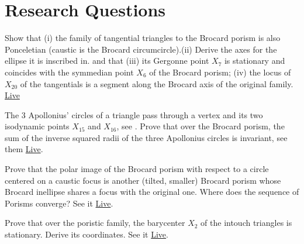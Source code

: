\section{Research Questions}

\begin{question}
Show that (i) the family of tangential triangles to the Brocard porism is also Ponceletian (caustic is the Brocard circumcircle).(ii) Derive the axes for the ellipse it is inscribed in.  and that (iii) its Gergonne point $X_7$ is stationary and coincides with the symmedian point $X_6$ of the Brocard porism; (iv) the locus of $X_{20}$ of the tangentials is a segment along the Brocard axis of the original family. \href{https://bit.ly/2RpNxdn}{Live} 
\end{question}

\begin{question}
The 3 Apollonius' circles of a triangle pass through a vertex and its two isodynamic points $X_{15}$ and $X_{16}$, see \cite[Isodynamic points]{mw}. Prove that over the Brocard porism, the sum of the inverse squared radii of the three Apollonius circles is invariant, see them \href{https://bit.ly/3elEzXI}{Live}.
\end{question}

\begin{question}
Prove that the polar image of the Brocard porism with respect to a circle centered on a caustic focus is another (tilted, smaller) Brocard porism whose Brocard inellipse shares a focus with the original one. Where does the sequence of Porisms converge? See it \href{https://bit.ly/3b7erOg}{Live}.
\end{question}

\begin{question}
Prove that over the poristic family, the barycenter $X_2$ of the intouch triangles is stationary. Derive its coordinates. See it \href{https://bit.ly/3i6DDsr}{Live}.
\end{question}
